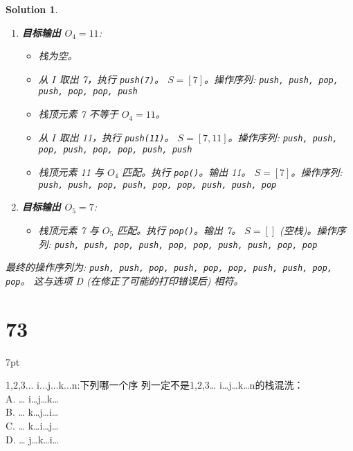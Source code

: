 \documentclass[UTF8]{report}
\newtheorem{solution}{Solution}
\theoremstyle{MyLineTheoremStyle} %
\theoremstyle{MyBlockTheoremStyle} %
\theoremstyle{MySubsubsectionStyle} %
\newenvironment{graybox}{%
        \def\FrameCommand{%
        \hspace{1pt}%
        {\color{gray}\small \vrule width 2pt}%
        {\color{graybox_color}\vrule width 4pt}%
        \colorbox{graybox_color}%
        }%
        \MakeFramed{\advance\hsize-\width\FrameRestore}%
        \noindent\hspace{-4.55pt}%
        \begin{adjustwidth}{}{7pt}%
        \vspace{2pt}\vspace{2pt}%
        }
        {%
        \vspace{2pt}\end{adjustwidth}\endMakeFramed%
        }
\begin{document}
\begin{solution}
\begin{enumerate}
    \item \textbf{目标输出 $O_4 = 11$}:
    \begin{itemize}
        \item 栈为空。
        \item 从 $I$ 取出 7，执行 \texttt{push(7)}。 $S = [7]$。操作序列: \texttt{push, push, pop, push, pop, pop, push}
        \item 栈顶元素 7 不等于 $O_4=11$。
        \item 从 $I$ 取出 11，执行 \texttt{push(11)}。 $S = [7, 11]$。操作序列: \texttt{push, push, pop, push, pop, pop, push, push}
        \item 栈顶元素 11 与 $O_4$ 匹配。执行 \texttt{pop()}。输出 11。 $S = [7]$。操作序列: \texttt{push, push, pop, push, pop, pop, push, push, pop}
    \end{itemize}

    \item \textbf{目标输出 $O_5 = 7$}:
    \begin{itemize}
        \item 栈顶元素 7 与 $O_5$ 匹配。执行 \texttt{pop()}。输出 7。 $S = []$ (空栈)。操作序列: \texttt{push, push, pop, push, pop, pop, push, push, pop, pop}
    \end{itemize}
\end{enumerate}

最终的操作序列为: \texttt{push, push, pop, push, pop, pop, push, push, pop, pop}。
这与选项 D (在修正了可能的打印错误后) 相符。

\end{solution}


\section*{73}
\begin{graybox}
{1,2,3... i...j...k...n}:下列哪一个序
列一定不是{1,2,3… i…j…k…n}的栈混洗：\\
A. {… i…j…k…} \\
B. {… k…j…i…} \\
C. {… k…i…j…} \\
D. {… j…k…i…}
\end{graybox}
\end{document}
